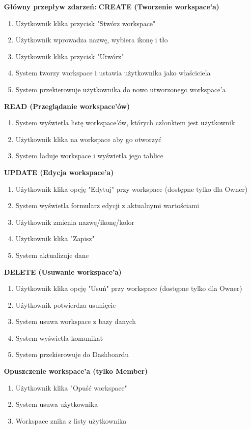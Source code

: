 \documentclass[12pt,a4paper]{article}
\begin{document}
\textbf{Główny przepływ zdarzeń:}
\textbf{CREATE (Tworzenie workspace'a)}
\begin{enumerate}[leftmargin=*]
    \item Użytkownik klika przycisk "Stwórz workspace"
    \item Użytkownik wprowadza nazwę, wybiera ikonę i tło
    \item Użytkownik klika przycisk "Utwórz"
    \item System tworzy workspace i ustawia użytkownika jako właściciela
    \item System przekierowuje użytkownika do nowo utworzonego workspace'a
\end{enumerate}
\textbf{READ (Przeglądanie workspace'ów)}
\begin{enumerate}[leftmargin=*]
    \item System wyświetla listę workspace'ów, których członkiem jest użytkownik
    \item Użytkownik klika na workspace aby go otworzyć
    \item System ładuje workspace i wyświetla jego tablice
\end{enumerate}
\textbf{UPDATE (Edycja workspace'a)}
\begin{enumerate}[leftmargin=*]
    \item Użytkownik klika opcję "Edytuj" przy workspace (dostępne tylko dla Owner)
    \item System wyświetla formularz edycji z aktualnymi wartościami
    \item Użytkownik zmienia nazwę/ikonę/kolor
    \item Użytkownik klika "Zapisz"
    \item System aktualizuje dane
\end{enumerate}
\textbf{DELETE (Usuwanie workspace'a)}
\begin{enumerate}[leftmargin=*]
    \item Użytkownik klika opcję "Usuń" przy workspace (dostępne tylko dla Owner)
    \item Użytkownik potwierdza usunięcie
    \item System usuwa workspace z bazy danych
    \item System wyświetla komunikat
    \item System przekierowuje do Dashboardu
\end{enumerate}
\textbf{Opuszczenie workspace'a (tylko Member)}
\begin{enumerate}[leftmargin=*]
    \item Użytkownik klika "Opuść workspace"
    \item System usuwa użytkownika
    \item Workspace znika z listy użytkownika
\end{enumerate}
\end{document}
